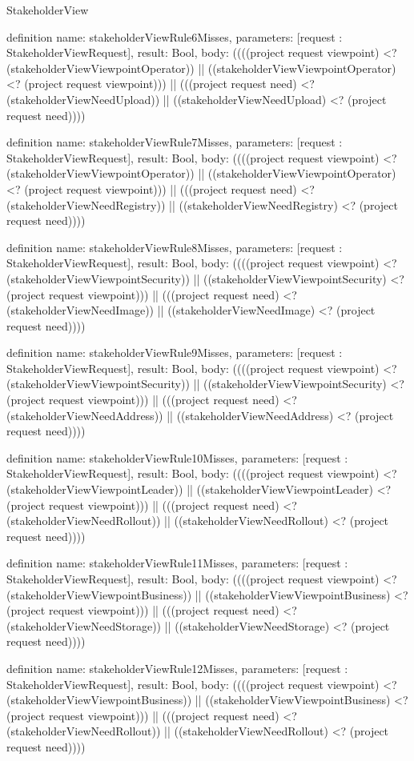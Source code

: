 \begin{lexlean}{StakeholderView}
\begin{semanticmodule}
definition{
  name: stakeholderViewRule6Misses,
  parameters: [request : StakeholderViewRequest],
  result: Bool,
  body: ((((project request viewpoint) <? (stakeholderViewViewpointOperator)) || ((stakeholderViewViewpointOperator) <? (project request viewpoint))) || (((project request need) <? (stakeholderViewNeedUpload)) || ((stakeholderViewNeedUpload) <? (project request need))))
}

definition{
  name: stakeholderViewRule7Misses,
  parameters: [request : StakeholderViewRequest],
  result: Bool,
  body: ((((project request viewpoint) <? (stakeholderViewViewpointOperator)) || ((stakeholderViewViewpointOperator) <? (project request viewpoint))) || (((project request need) <? (stakeholderViewNeedRegistry)) || ((stakeholderViewNeedRegistry) <? (project request need))))
}

definition{
  name: stakeholderViewRule8Misses,
  parameters: [request : StakeholderViewRequest],
  result: Bool,
  body: ((((project request viewpoint) <? (stakeholderViewViewpointSecurity)) || ((stakeholderViewViewpointSecurity) <? (project request viewpoint))) || (((project request need) <? (stakeholderViewNeedImage)) || ((stakeholderViewNeedImage) <? (project request need))))
}

definition{
  name: stakeholderViewRule9Misses,
  parameters: [request : StakeholderViewRequest],
  result: Bool,
  body: ((((project request viewpoint) <? (stakeholderViewViewpointSecurity)) || ((stakeholderViewViewpointSecurity) <? (project request viewpoint))) || (((project request need) <? (stakeholderViewNeedAddress)) || ((stakeholderViewNeedAddress) <? (project request need))))
}

definition{
  name: stakeholderViewRule10Misses,
  parameters: [request : StakeholderViewRequest],
  result: Bool,
  body: ((((project request viewpoint) <? (stakeholderViewViewpointLeader)) || ((stakeholderViewViewpointLeader) <? (project request viewpoint))) || (((project request need) <? (stakeholderViewNeedRollout)) || ((stakeholderViewNeedRollout) <? (project request need))))
}

definition{
  name: stakeholderViewRule11Misses,
  parameters: [request : StakeholderViewRequest],
  result: Bool,
  body: ((((project request viewpoint) <? (stakeholderViewViewpointBusiness)) || ((stakeholderViewViewpointBusiness) <? (project request viewpoint))) || (((project request need) <? (stakeholderViewNeedStorage)) || ((stakeholderViewNeedStorage) <? (project request need))))
}

definition{
  name: stakeholderViewRule12Misses,
  parameters: [request : StakeholderViewRequest],
  result: Bool,
  body: ((((project request viewpoint) <? (stakeholderViewViewpointBusiness)) || ((stakeholderViewViewpointBusiness) <? (project request viewpoint))) || (((project request need) <? (stakeholderViewNeedRollout)) || ((stakeholderViewNeedRollout) <? (project request need))))
}


\end{semanticmodule}
\end{lexlean}
